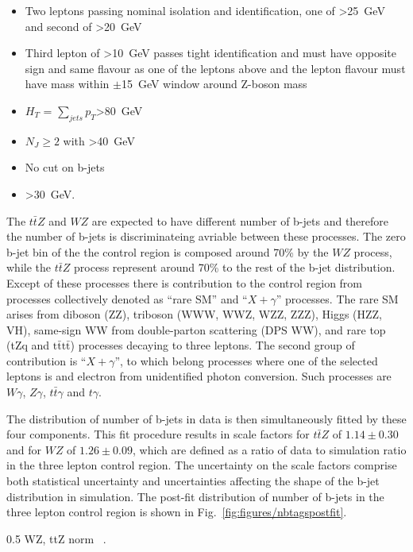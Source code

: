 \begin{itemize}
\item Two leptons passing nominal isolation and identification, one of \pt>25~GeV and second of \pt>20~GeV
\item Third lepton of \pt>10~GeV passes tight identification and must have opposite sign and same flavour as one of the leptons above and the lepton flavour must have mass within $\pm$15~GeV window around Z-boson mass
\item $H_{T}$ = $\sum_{jets} p_{T}$>80~GeV
\item $N_{J} \geq 2$ with \pt>40~GeV
\item No cut on b-jets
\item \MET>30~GeV.

\end{itemize}

The $t\bar{t}Z$ and  $WZ$ are expected to have different number of b-jets and therefore the number of b-jets is discriminateing avriable between these processes. The zero b-jet bin of the the control region is composed around 70\% by the $WZ$ process, while the $t\bar{t}Z$ process represent around 70\% to the rest of the b-jet distribution. Except of these processes there is contribution to the control region from processes collectively denoted as ``rare SM'' and ``$X+\gamma$'' processes. The rare SM arises from diboson (ZZ), triboson (WWW, WWZ, WZZ, ZZZ), Higgs (HZZ, VH), same-sign WW from double-parton scattering (DPS WW), and rare top (tZq and $\mathrm{t\bar{t}t\bar{t}}$) processes decaying to three leptons. The second group of contribution is ``$X+\gamma$'', to which belong processes where one of the selected leptons is and electron from unidentified photon conversion. Such processes are $W\gamma$, $Z\gamma$, $t\bar{t}\gamma$ and $t\gamma$.

The distribution of number of b-jets in data is then simultaneously fitted by these four components. This fit procedure results in scale factors for $t\bar{t}Z$ of $1.14 \pm 0.30$ and for $WZ$ of $1.26 \pm 0.09$, which are defined as a ratio of data to simulation ratio in the three lepton control region. The uncertainty on the scale factors comprise both statistical uncertainty and uncertainties affecting the shape of the b-jet distribution in simulation. The post-fit distribution of number of b-jets in the three lepton control region is shown in Fig.~\ref{fig:figures/nbtagspostfit}.

                 {0.5}       %
                 { WZ, ttZ norm ~\cite{Sirunyan:2017uyt}. }


